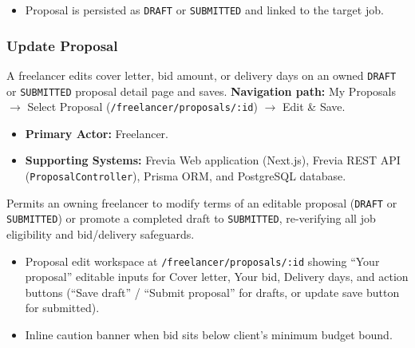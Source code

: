 \begin{itemize}[leftmargin=1.6em,topsep=3pt,itemsep=2pt,parsep=0pt,label=$\bullet$]
    \item Proposal is persisted as \texttt{DRAFT} or \texttt{SUBMITTED} and linked to the target job.
\end{itemize}

\subsubsection{Update Proposal}

A freelancer edits cover letter, bid amount, or delivery days on an owned \texttt{DRAFT} or \texttt{SUBMITTED} proposal detail page and saves.\newline
\textbf{Navigation path:} My Proposals $\rightarrow$ Select Proposal (\texttt{/freelancer/proposals/:id}) $\rightarrow$ Edit \& Save.


\begin{itemize}[leftmargin=1.6em,topsep=3pt,itemsep=2pt,parsep=0pt,label=$\bullet$]
    \item \textbf{Primary Actor:} Freelancer.
    \item \textbf{Supporting Systems:} Frevia Web application (Next.js), Frevia REST API (\texttt{ProposalController}), Prisma ORM, and PostgreSQL database.
\end{itemize}

\noindent Permits an owning freelancer to modify terms of an editable proposal (\texttt{DRAFT} or \texttt{SUBMITTED}) or promote a completed draft to \texttt{SUBMITTED}, re-verifying all job eligibility and bid/delivery safeguards.

\begin{itemize}[leftmargin=1.6em,topsep=3pt,itemsep=2pt,parsep=0pt,label=$\bullet$]
    \item Proposal edit workspace at \texttt{/freelancer/proposals/:id} showing ``Your proposal'' editable inputs for Cover letter, Your bid, Delivery days, and action buttons (``Save draft'' / ``Submit proposal'' for drafts, or update save button for submitted).
    \item Inline caution banner when bid sits below client's minimum budget bound.
\end{itemize}

